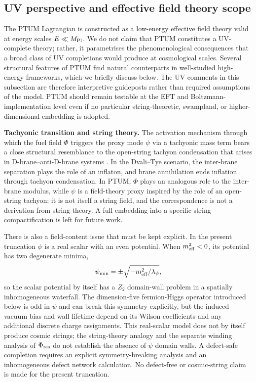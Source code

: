 \documentclass[epj]{svjour}
\begin{document}
\subsection{UV perspective and effective field theory scope}
\label{sec:uv_perspective}

The PTUM Lagrangian is constructed as a low-energy effective field
theory valid at energy scales $E \ll M_{\rm Pl}$. We do not claim
that PTUM constitutes a UV-complete theory; rather, it parametrises
the phenomenological consequences that a broad class of UV
completions would produce at cosmological scales. Several structural
features of PTUM find natural counterparts in well-studied
high-energy frameworks, which we briefly discuss below. The UV comments in
this subsection are therefore interpretive guideposts rather than required
assumptions of the model. PTUM should remain testable at the EFT and
Boltzmann-implementation level even if no particular string-theoretic,
swampland, or higher-dimensional embedding is adopted.

\noindent\textbf{Tachyonic transition and string theory.}
The activation mechanism through which the fuel field $\Phi$ triggers
the proxy mode $\psi$ via a tachyonic mass term bears a close
structural resemblance to the open-string tachyon condensation that
arises in D-brane--anti-D-brane systems
\cite{Sen2002,Dvali1999,KKLMMT2003}. In the Dvali--Tye scenario, the
inter-brane separation plays the role of an inflaton, and brane
annihilation ends inflation through tachyon condensation. In PTUM,
$\Phi$ plays an analogous role to the inter-brane modulus, while
$\psi$ is a field-theory proxy inspired by the role of an
open-string tachyon; it is not itself a string field, and the
correspondence is not a derivation from string theory. A full
embedding into a specific string compactification is left for
future work.

There is also a field-content issue that must be kept explicit.
In the present truncation $\psi$ is a real scalar with an even
potential. When $m_{\rm eff}^2<0$, its potential has two degenerate
minima,
\[
\psi_{\rm min}=\pm\sqrt{-m_{\rm eff}^2/\lambda_\psi},
\]
so the scalar potential by itself has a $Z_2$ domain-wall
problem in a spatially inhomogeneous waterfall. The dimension-five
fermion-Higgs operator introduced below is odd in $\psi$ and can
break this symmetry explicitly, but the induced vacuum bias and
wall lifetime depend on its Wilson coefficients and any additional
discrete charge assignments. This real-scalar model does not by
itself produce cosmic strings; the string-theory analogy and the
separate winding analysis of $\Phi_{\rm res}$ do not establish the
absence of $\psi$ domain walls. A defect-safe completion requires
an explicit symmetry-breaking analysis and an inhomogeneous defect
network calculation. No defect-free or cosmic-string claim is made
for the present truncation.
\end{document}
